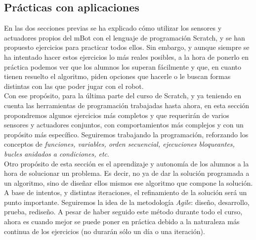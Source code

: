 \subsection{Prácticas con aplicaciones}\label{subsec:practicasaplicaciones}
En las dos secciones previas se ha explicado cómo utilizar los sensores y actuadores propios del mBot con el lenguaje de programación Scratch, y se han propuesto ejercicios para practicar todos ellos. Sin embargo, y aunque siempre se ha intentado hacer estos ejercicios lo más reales posibles, a la hora de ponerlo en práctica podemos ver que los alumnos los superan fácilmente y que, en cuanto tienen resuelto el algoritmo, piden opciones que hacerle o le buscan formas distintas con las que poder jugar con el robot. \\
Con ese propósito, para la última parte del curso de Scratch, y ya teniendo en cuenta las herramientas de programación trabajadas hasta ahora, en esta sección propondremos algunos ejercicios más completos y que requerirán de varios sensores y actuadores conjuntos, con comportamientos más complejos y con un propósito más específico. Seguiremos trabajando la programación, reforzando los conceptos de \textit{funciones, variables, orden secuencial, ejecuciones bloqueantes, bucles anidados a condiciones, etc}. \\
Otro propósito de esta sección es el aprendizaje y autonomía de los alumnos a la hora de solucionar un problema. Es decir, no ya de dar la solución programada a un algoritmo, sino de diseñar ellos mismos ese algoritmo que compone la solución. A base de intentos, y distintas iteraciones, el refinamiento de la solución será un punto importante. Seguiremos la idea de la metodología \textit{Agile}: diseño, desarrollo, prueba, rediseño. A pesar de haber seguido este método durante todo el curso, ahora es cuando mejor se puede poner en práctica debido a la naturaleza más continua de los ejercicios (no durarán sólo un día o una iteración).


